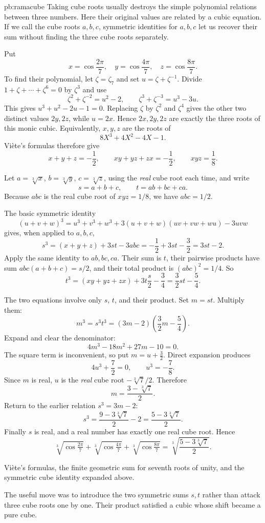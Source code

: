 \begin{solution}{pb:ramacube}
\idea Taking cube roots usually destroys the simple polynomial relations between three numbers. Here their original values are related by a cubic equation. If we call the cube roots $a,b,c$, symmetric identities for $a,b,c$ let us recover their sum without finding the three cube roots separately.

\writeup Put
\[
x=\cos\frac{2\pi}7,\quad
y=\cos\frac{4\pi}7,\quad
z=\cos\frac{8\pi}7.
\]
To find their polynomial, let $\zeta=\zeta_7$ and set $u=\zeta+\zeta^{-1}$. Divide $1+\zeta+\cdots+\zeta^6=0$ by $\zeta^3$ and use
\[
\zeta^2+\zeta^{-2}=u^2-2,\qquad
\zeta^3+\zeta^{-3}=u^3-3u.
\]
This gives $u^3+u^2-2u-1=0$. Replacing $\zeta$ by $\zeta^2$ and $\zeta^4$ gives the other two distinct values $2y,2z$, while $u=2x$. Hence $2x,2y,2z$ are exactly the three roots of this monic cubic. Equivalently, $x,y,z$ are the roots of
\[
8X^3+4X^2-4X-1.
\]
Viète's formulas therefore give
\[
x+y+z=-\frac12,\qquad
xy+yz+zx=-\frac12,\qquad xyz=\frac18.
\]

Let $a=\sqrt[3]x$, $b=\sqrt[3]y$, $c=\sqrt[3]z$, using the \emph{real} cube root each time, and write
\[
s=a+b+c,\qquad t=ab+bc+ca.
\]
Because $abc$ is the real cube root of $xyz=1/8$, we have $abc=1/2$.

The basic symmetric identity
\[
(u+v+w)^3=u^3+v^3+w^3
 +3(u+v+w)(uv+vw+wu)-3uvw
\]
gives, when applied to $a,b,c$,
\[
s^3=(x+y+z)+3st-3abc
=-\frac12+3st-\frac32=3st-2.
\]
Apply the same identity to $ab,bc,ca$. Their sum is $t$, their pairwise products have sum $abc(a+b+c)=s/2$, and their total product is $(abc)^2=1/4$. So
\[
t^3=(xy+yz+zx)+3t\frac{s}{2}-\frac34
=\frac32st-\frac54.
\]

The two equations involve only $s$, $t$, and their product. Set $m=st$. Multiply them:
\[
m^3=s^3t^3=(3m-2)\left(\frac32m-\frac54\right).
\]
Expand and clear the denominator:
\[
4m^3-18m^2+27m-10=0.
\]
The square term is inconvenient, so put $m=u+\frac32$. Direct expansion produces
\[
4u^3+\frac72=0,\qquad u^3=-\frac78.
\]
Since $m$ is real, $u$ is the \emph{real} cube root $-\sqrt[3]7/2$. Therefore
\[
m=\frac{3-\sqrt[3]7}{2}.
\]
Return to the earlier relation $s^3=3m-2$:
\[
s^3=\frac{9-3\sqrt[3]7}{2}-2
=\frac{5-3\sqrt[3]7}{2}.
\]
Finally $s$ is real, and a real number has exactly one real cube root. Hence
\[
\boxed{\sqrt[3]{\cos\tfrac{2\pi}7}
+\sqrt[3]{\cos\tfrac{4\pi}7}
+\sqrt[3]{\cos\tfrac{8\pi}7}
=\sqrt[3]{\frac{5-3\sqrt[3]7}{2}}.}
\]

\tools Viète's formulas, the finite geometric sum for seventh roots of unity, and the symmetric cube identity expanded above.

\leads The useful move was to introduce the two symmetric sums $s,t$ rather than attack three cube roots one by one. Their product satisfied a cubic whose shift became a pure cube.
\end{solution}

